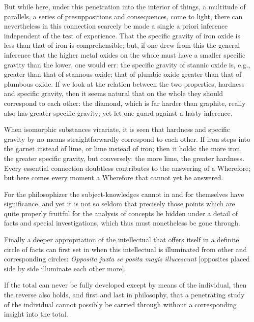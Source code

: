 \documentclass[12pt]{book}
\begin{document}
But while here, under this penetration into the interior of things, a multitude of parallels, a
series of presuppositions and consequences, come to light, there can nevertheless in this connection
scarcely be made a single a priori inference independent of the test of experience. That the
specific gravity of iron oxide is less than that of iron is comprehensible; but, if one drew from
this the general inference that the higher
metal oxides on the whole must have a smaller specific gravity than the lower, one would err: the
specific gravity of stannic oxide is, e.g., greater than that of stannous oxide; that of plumbic
oxide greater than that of plumbous oxide. If we look at the relation between the two properties,
hardness and specific gravity, then it seems natural that on the whole they should correspond to each
other: the diamond, which is far harder than graphite, really also has greater specific gravity;
yet let one guard against a hasty inference.

When isomorphic substances vicariate, it is seen that hardness and specific gravity by no means
straightforwardly correspond to each other. If iron steps into the garnet instead of lime, or lime
instead of iron; then it holds: the more iron, the greater specific gravity, but conversely: the more
lime, the greater hardness. Every
essential connection doubtless contributes to the answering of a Wherefore; but here comes every
moment a Wherefore that cannot yet be answered.

For the philosophizer the subject-knowledges cannot in and for themselves have significance, and
yet it is not so seldom that precisely those points which are quite properly fruitful for the
analysis of concepts lie hidden under a detail of facts and special investigations, which thus
must nonetheless be gone through.

Finally a deeper appropriation of the intellectual that offers itself in a definite circle of
facts can first set in when this intellectual is illuminated from other and corresponding
circles: \textit{Opposita juxta se posita magis illucescunt} [opposites placed side by side
illuminate each other more].

If the total can never be fully developed except by means of the individual, then the reverse
also holds, and first and last in philosophy, that a penetrating study of the individual cannot
possibly be carried through without a corresponding insight into the total.
\end{document}
